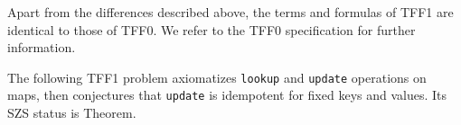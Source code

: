%
%
%
%

 Apart from the differences described above,
the terms and formulas of TFF1 are identical to those of TFF0. We refer to the
TFF0 specification \cite{sutcliffe-et-al-2011-tff0} for further information.

 The following TFF1 problem axiomatizes {\tt lookup} and
{\tt update} operations on maps, then conjectures that {\tt update} is idempotent
for fixed keys and values. Its SZS status \cite{sutcliffe-2008-szs} is Theorem.


